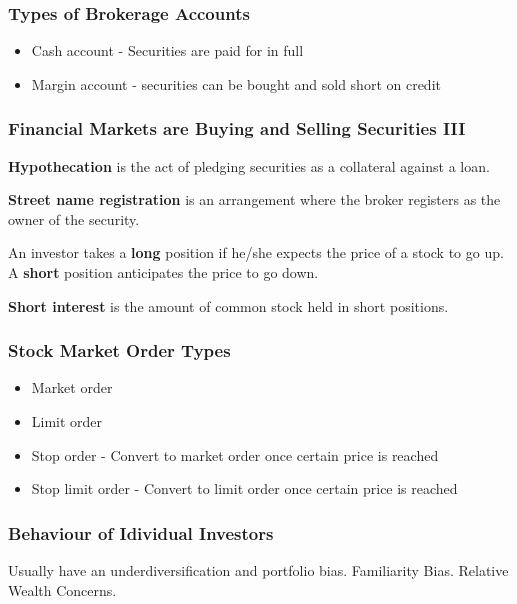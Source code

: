 \documentclass[english, 12pt]{article}
\begin{document}
\subsubsection*{Types of Brokerage Accounts}
\begin{itemize}
\item Cash account - Securities are paid for in full
\item Margin account - securities can be bought and sold short on credit
\end{itemize}
\subsubsection*{Financial Markets are Buying and Selling Securities III}
\begin{defn}
\textbf{Hypothecation} is the act of pledging securities as a collateral against a loan.
\end{defn}
\begin{defn}
\textbf{Street name registration} is an arrangement where the broker registers as the owner of the security.
\end{defn}
\begin{defn}
An investor takes a \textbf{long} position if he/she expects the price of a stock to go up. A \textbf{short} position anticipates the price to go down.
\end{defn}
\begin{defn}
\textbf{Short interest} is the amount of common stock held in short positions.
\end{defn}
\subsubsection*{Stock Market Order Types}
\begin{itemize}
\item Market order
\item Limit order 
\item Stop order - Convert to market order once certain price is reached
\item Stop limit order - Convert to limit order once certain price is reached
\end{itemize}

\subsubsection{Behaviour of Idividual Investors}
Usually have an underdiversification and portfolio bias. Familiarity Bias. Relative Wealth Concerns.
\end{document}
